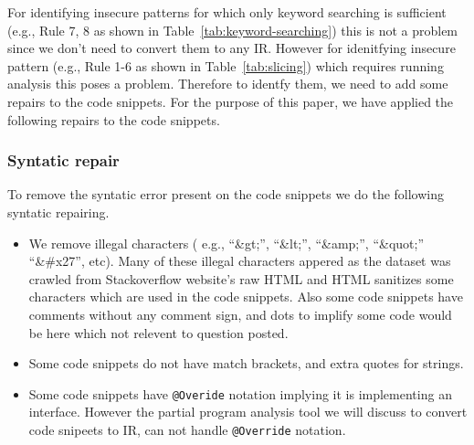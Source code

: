 For identifying insecure patterns for which only keyword searching is sufficient (e.g., Rule 7, 8 as shown in Table~\ref{tab:keyword-searching}) 
this is not a problem since we don't need to convert them to any IR. However for idenitfying insecure pattern (e.g., Rule 1-6 as shown in
 Table~\ref{tab:slicing}) which requires running analysis this poses a problem. Therefore to identfy them, we need to add some 
 repairs to the code snippets. For the purpose of this paper, we have applied the following repairs to the code snippets.

\subsubsection{Syntatic repair}
To remove the syntatic error present on the code snippets we do the following syntatic repairing.
  \begin{itemize}
    \item We remove illegal characters ( e.g., ``\&gt;'', ``\&lt;'', ``\&amp;'', ``\&quot;'' ``\&\#x27'', etc). Many of these illegal
     characters appered as the dataset was crawled from Stackoverflow website's raw HTML and HTML sanitizes some characters which are used in the code snippets. Also some code snippets have comments without any comment sign, and dots to implify some code would be here which not relevent to question posted.    
    \item Some code snippets do not have match brackets, and extra quotes for strings. 
    \item Some code snippets have \texttt{@Overide} notation implying it is implementing an interface. However the partial program analysis 
    tool we will discuss to convert code snipeets to IR, can not handle \texttt{@Override} notation.
  \end{itemize}
     

